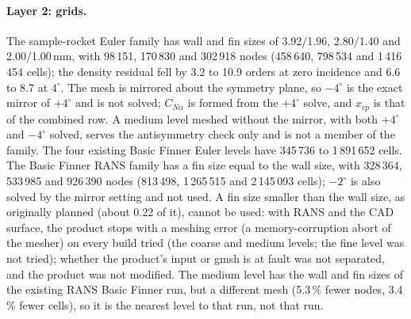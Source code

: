 \documentclass[twocolumn]{labreport}
\newcommand{\CNa}{C_{N\alpha}}
\begin{document}
\paragraph{Layer 2: grids.}
The sample-rocket Euler family has wall and fin sizes of 3.92/1.96, 2.80/1.40 and 2.00/1.00\,mm, with 98\,151, 170\,830 and 302\,918 nodes (458\,640, 798\,534 and 1\,416\,454 cells); the density residual fell by 3.2 to 10.9 orders at zero incidence and 6.6 to 8.7 at $4^\circ$.
The mesh is mirrored about the symmetry plane, so $-4^\circ$ is the exact mirror of $+4^\circ$ and is not solved; $\CNa$ is formed from the $+4^\circ$ solve, and $x_{cp}$ is that of the combined row.
A medium level meshed without the mirror, with both $+4^\circ$ and $-4^\circ$ solved, serves the antisymmetry check only and is not a member of the family.
The four existing Basic Finner Euler levels have 345\,736 to 1\,891\,652 cells.
The Basic Finner RANS family has a fin size equal to the wall size, with 328\,364, 533\,985 and 926\,390 nodes (813\,498, 1\,265\,515 and 2\,145\,093 cells); $-2^\circ$ is also solved by the mirror setting and not used.
A fin size smaller than the wall size, as originally planned (about 0.22 of it), cannot be used: with RANS and the CAD surface, the product stops with a meshing error (a memory-corruption abort of the mesher) on every build tried (the coarse and medium levels; the fine level was not tried); whether the product's input or gmsh is at fault was not separated, and the product was not modified.
The medium level has the wall and fin sizes of the existing RANS Basic Finner run, but a different mesh (5.3\,\% fewer nodes, 3.4\,\% fewer cells), so it is the nearest level to that run, not that run.
\end{document}

